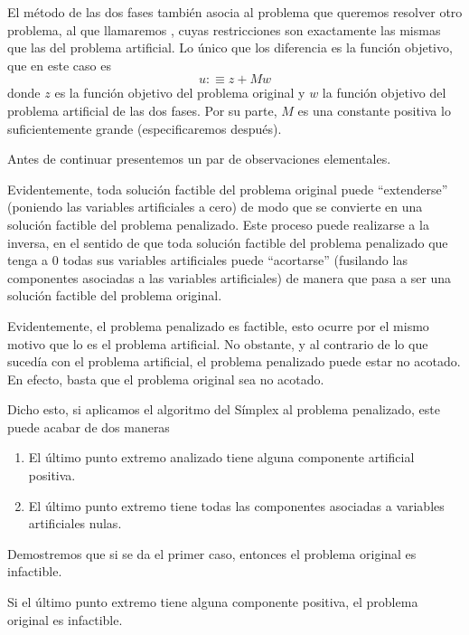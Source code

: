 El método de las dos fases también asocia al problema que queremos resolver otro problema, al que llamaremos , cuyas restricciones son exactamente las mismas que las del problema artificial. Lo único que los diferencia es la función objetivo, que en este caso es
\begin{equation*}
	u:\equiv z+Mw
\end{equation*}
donde $z$ es la función objetivo del problema original y $w$ la función objetivo del problema artificial de las dos fases. Por su parte, $M$ es una constante positiva lo suficientemente grande (especificaremos después).

Antes de continuar presentemos un par de observaciones elementales.
\begin{obs}
	Evidentemente, toda solución factible del problema original puede ``extenderse'' (poniendo las variables artificiales a cero) de modo que se convierte en una solución factible del problema penalizado. Este proceso puede realizarse a la inversa, en el sentido de que toda solución factible del problema penalizado que tenga a $0$ todas sus variables artificiales puede ``acortarse'' (fusilando las componentes asociadas a las variables artificiales) de manera que pasa a ser una solución factible del problema original.
\end{obs}
\begin{obs}[Sutilezas]
	Evidentemente, el problema penalizado es factible, esto ocurre por el mismo motivo que lo es el problema artificial. No obstante, y al contrario de lo que sucedía con el problema artificial, el problema penalizado puede estar no acotado. En efecto, basta que el problema original sea no acotado.
\end{obs}
Dicho esto, si aplicamos el algoritmo del Símplex al problema penalizado, este puede acabar de dos maneras
\begin{enumerate}
	\item El último punto extremo analizado tiene alguna componente artificial positiva.
	\item El último punto extremo tiene todas las componentes asociadas a variables artificiales nulas.
\end{enumerate}
Demostremos que si se da el primer caso, entonces el problema original es infactible.
\begin{prop}
	Si el último punto extremo tiene alguna componente positiva, el problema original es infactible.
\end{prop}

